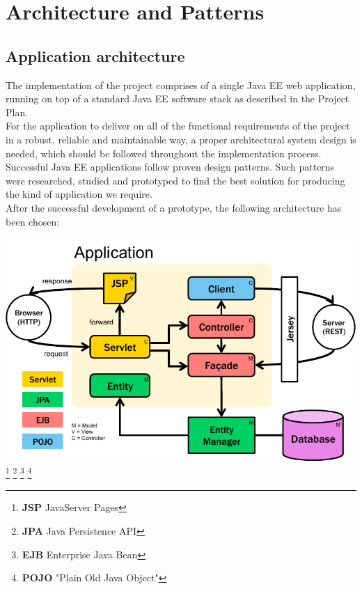 \section{Architecture and Patterns}

\subsection{Application architecture}

The implementation of the project comprises of a single Java EE web application, running on top of a standard Java EE software stack as described in the Project Plan.\\

For the application to deliver on all of the functional requirements of the project in a robust, reliable and maintainable way, a proper architectural system design is needed, which should be followed throughout the implementation process.\\

Successful Java EE applications follow proven design patterns. Such patterns were researched, studied and prototyped to find the best solution for producing the kind of application we require.\\

After the successful development of a prototype, the following architecture has been chosen:

\begin{center}
\includegraphics[scale=1]{img/architecture.pdf}  
\footnote{\textbf{JSP} JavaServer Pages}
\footnote{\textbf{JPA} Java Persistence API}
\footnote{\textbf{EJB} Enterprise Java Bean}
\footnote{\textbf{POJO} "Plain Old Java Object"}
\end{center}

